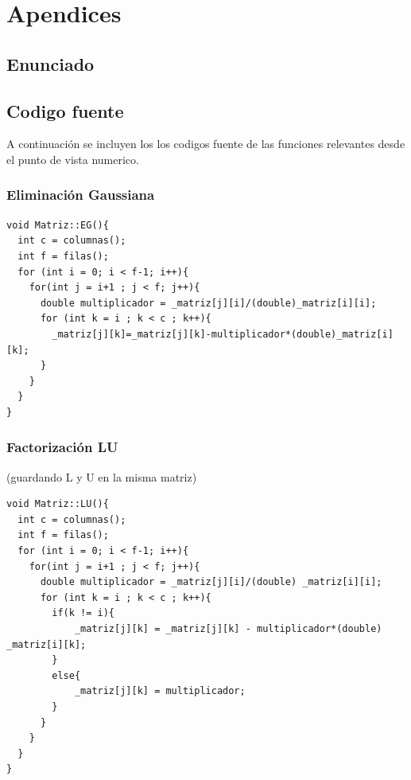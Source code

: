 \documentclass[12pt,a4paper]{article}
\begin{document}

\section{Apendices}

\subsection{Enunciado}



\subsection{Codigo fuente}
A continuación se incluyen los los codigos fuente de las funciones relevantes desde el punto de vista numerico.

\subsubsection{Eliminación Gaussiana}
\begin{lstlisting}
void Matriz::EG(){
  int c = columnas();
  int f = filas();
  for (int i = 0; i < f-1; i++){
    for(int j = i+1 ; j < f; j++){
      double multiplicador = _matriz[j][i]/(double)_matriz[i][i];
      for (int k = i ; k < c ; k++){
        _matriz[j][k]=_matriz[j][k]-multiplicador*(double)_matriz[i][k];
      }
    }
  }
}
\end{lstlisting}

\subsubsection{Factorización LU}
(guardando L y U en la misma matriz)
\begin{lstlisting}
void Matriz::LU(){
  int c = columnas();
  int f = filas();
  for (int i = 0; i < f-1; i++){
    for(int j = i+1 ; j < f; j++){
      double multiplicador = _matriz[j][i]/(double) _matriz[i][i];
      for (int k = i ; k < c ; k++){
        if(k != i){
            _matriz[j][k] = _matriz[j][k] - multiplicador*(double) _matriz[i][k];
        }
        else{
            _matriz[j][k] = multiplicador;
        }
      }
    }
  }
}
\end{lstlisting}
\end{document}
